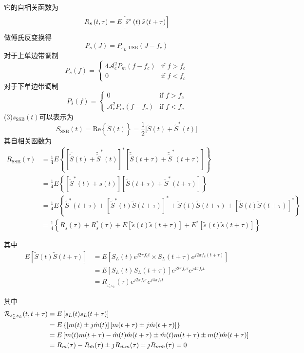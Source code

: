 \documentclass[utf8]{article}
\begin{document}
它的自相关函数为
$$R_{\bar{s}}\left(t,\tau\right)=E\Bigl[\tilde{s}^{*}\left(t\right)\tilde{s}\left(t+\tau\right)\Bigr]$$
做傅氏反变换得
$$P_{\bar{s}}\left(J\right)=P_{s_{L},\mathrm{USB}}\left(J-f_{c}\right)$$
对于上单边带调制
$$
P_{\bar{s}}(f) = 
\begin{cases}
4\mathcal{A}_{c}^{2}P_{m}(f - f_{c}) & \text{if } f > f_{c} \\
0 & \text{if } f < f_{c}
\end{cases}
$$
对于下单边带调制
$$
P_{\bar{s}}(f) = 
\begin{cases}
0 & \text{if } f > f_{c} \\
\mathcal{A}_{c}^{2}P_{m}(f - f_{c}) & \text{if } f < f_{c}
\end{cases}
$$
(3)$s_{\mathrm{SSB}}\left(t\right)$可以表示为$$S_{\mathrm{SSB}}\left(t\right)=\mathrm{Re}\left\{\widetilde{S}\left(t\right)\right\}=\frac{1}{2}\biggl[\widetilde{S}\left(t\right)+\widetilde{S}^{*}\left(t\right)\biggr]$$
其自相关函数为
\begin{align*}
R_{\mathrm{SSB}}(\tau) &= \frac{1}{4} E\left\{ \left[\bar{\tilde{S}}(t)+\tilde{\tilde{S}}^{*}(t)\right]^* \left[\tilde{\tilde{S}}(t+\tau)+\tilde{\tilde{S}}^{*}(t+\tau)\right]\right\} \\
&= \frac{1}{4} E\left\{ \left[\tilde{S}^*(t)+s(t)\right] \left[\tilde{S}(t+\tau)+\tilde{S}^*(t+\tau)\right]\right\} \\
&= \frac{1}{4} E\left\{ \tilde{S}^*(t+\tau) + \left[ \tilde{S}^*(t) \tilde{S}(t+\tau) \right]^* + \tilde{S}(t) \tilde{S}(t+\tau) + \left[ \tilde{S}(t) \tilde{S}(t+\tau) \right]^* \right\} \\
&= \frac{1}{4} \left\{ R_{\tilde{s}}(\tau) + R_{\tilde{s}}^*(\tau) + E\left[\tilde{s}(t)\tilde{s}(t+\tau)\right] + E^*\left[\tilde{s}(t)\tilde{s}(t+\tau)\right] \right\}
\end{align*}

其中
\begin{align*}
E\left[\tilde{S}(t)\tilde{S}(t+\tau)\right] &= E\left[S_{L}(t)e^{j2\pi f_{c}t} \times S_{L}(t+\tau)e^{j2\pi f_{c}(t+\tau)}\right] \\
&= E\left[ S_{L}(t)S_{L}(t+\tau) \right] e^{j2\pi f_{c}\tau} e^{j4\pi f_{c}t} \\
&= R_{_{S_{L}^{*}S_{L}}}(\tau) e^{j2\pi f_{c}\tau} e^{j4\pi f_{c}t} 
\end{align*}

其中
\begin{align*}
{\cal{R}}_{s_{L}^{*}s_{L}}(t,t+\tau) &= E\left[s_{L}(t)s_{L}(t+\tau)\right] \\
&= E\left\{\left[m(t) \pm j\hat{m}(t)\right]\left[m(t+\tau) \pm j\hat{m}(t+\tau)\right]\right\} \\
&= E\left[m(t)m(t+\tau) - \hat{m}(t)\hat{m}(t+\tau) \pm \hat{m}(t)m(t+\tau) \pm m(t)\hat{m}(t+\tau)\right] \\
&= R_m(\tau) - R_{\hat{m}}(\tau) \pm j R_{\hat{m}m}(\tau) \pm j R_{m\hat{m}}(\tau) = 0
\end{align*}
\end{document}
